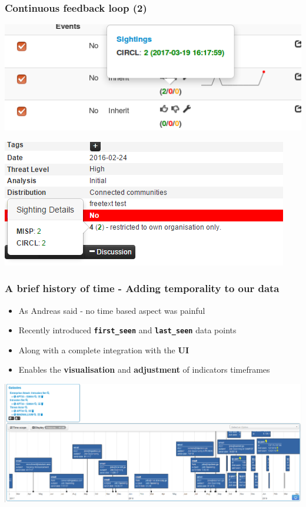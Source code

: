 \begin{frame}
  \frametitle{Continuous feedback loop (2)}
  \begin{center}
    \includegraphics[scale=0.5]{sighting-n.png}
  \end{center}
  \begin{center}
    \includegraphics[scale=0.60]{Sightings2.PNG}
  \end{center}  
\end{frame}

\begin{frame}
  \frametitle{A brief history of time - Adding temporality to our data}
  \begin{itemize}
    \item As Andreas said - no time based aspect was painful
    \item Recently introduced {\bf \texttt{first\_seen}} and {\bf \texttt{last\_seen}} data points
    \item Along with a complete integration with the {\bf UI}
    \item Enables the {\bf visualisation} and {\bf adjustment} of indicators timeframes 
  \end{itemize}
  \begin{center}
    \includegraphics[width=1.0\linewidth]{timeline-misp-overview.png}
  \end{center}
\end{frame}

